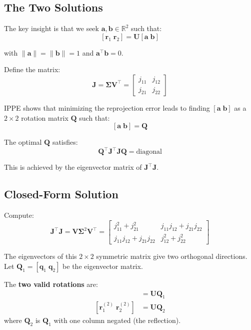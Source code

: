 \documentclass[11pt]{article}
\newcommand{\vect}[1]{\mathbf{#1}}
\newcommand{\mat}[1]{\mathbf{#1}}
\begin{document}
\subsection{The Two Solutions}

The key insight is that we seek $\vect{a}, \vect{b} \in \mathbb{R}^2$ such that:
\[
[\vect{r}_1 \; \vect{r}_2] = \mat{U}[\vect{a} \; \vect{b}]
\]

with $\|\vect{a}\| = \|\vect{b}\| = 1$ and $\vect{a}^\top\vect{b} = 0$.

Define the matrix:
\[
\mat{J} = \mat{\Sigma}\mat{V}^\top =
\begin{bmatrix}
j_{11} & j_{12} \\
j_{21} & j_{22}
\end{bmatrix}
\]

IPPE shows that minimizing the reprojection error leads to finding $[\vect{a} \; \vect{b}]$ as a $2 \times 2$ rotation matrix $\mat{Q}$ such that:
\[
[\vect{a} \; \vect{b}] = \mat{Q}
\]

The optimal $\mat{Q}$ satisfies:
\[
\mat{Q}^\top \mat{J}^\top \mat{J} \mat{Q} = \text{diagonal}
\]

This is achieved by the eigenvector matrix of $\mat{J}^\top\mat{J}$.

\subsection{Closed-Form Solution}

Compute:
\[
\mat{J}^\top\mat{J} = \mat{V}\mat{\Sigma}^2\mat{V}^\top =
\begin{bmatrix}
j_{11}^2 + j_{21}^2 & j_{11}j_{12} + j_{21}j_{22} \\
j_{11}j_{12} + j_{21}j_{22} & j_{12}^2 + j_{22}^2
\end{bmatrix}
\]

The eigenvectors of this $2 \times 2$ symmetric matrix give two orthogonal directions. Let $\mat{Q}_1 = [\vect{q}_1 \; \vect{q}_2]$ be the eigenvector matrix.

\begin{planarbox}
The \textbf{two valid rotations} are:
\begin{align}
[\vect{r}_1^{(1)} \; \vect{r}_2^{(1)}] &= \mat{U}\mat{Q}_1 \\
[\vect{r}_1^{(2)} \; \vect{r}_2^{(2)}] &= \mat{U}\mat{Q}_2
\end{align}
where $\mat{Q}_2$ is $\mat{Q}_1$ with one column negated (the reflection).
\end{planarbox}
\end{document}
